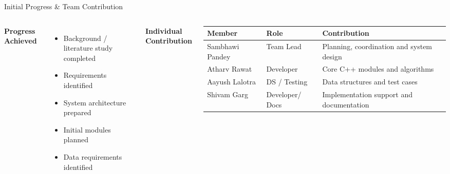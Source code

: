 \documentclass[aspectratio=169,11pt]{beamer}
\begin{document}
\begin{frame}{Initial Progress \& Team Contribution}

\begin{columns}[T,totalwidth=\textwidth]


\textbf{\color{GEUBlue}Progress Achieved}

\begin{itemize}
\itemsep3pt

\item Background / literature study completed
\item Requirements identified
\item System architecture prepared
\item Initial modules planned
\item Data requirements identified

\end{itemize}


\textbf{\color{GEUBlue}Individual Contribution}

\vspace{2mm}

\scriptsize

\begin{tabularx}{\textwidth}
{@{}p{1.6cm}p{2.0cm}X@{}}

\toprule

Member & Role & Contribution\\

\midrule

Sambhawi Pandey & Team Lead &
Planning, coordination and system design
\\

Atharv Rawat & Developer &
Core C++ modules and algorithms
\\

Aayush Lalotra & DS / Testing &
Data structures and test cases
\\

Shivam Garg & Developer/ Docs &
Implementation support and documentation
\\

\bottomrule

\end{tabularx}

\end{columns}

\end{frame}
\end{document}
